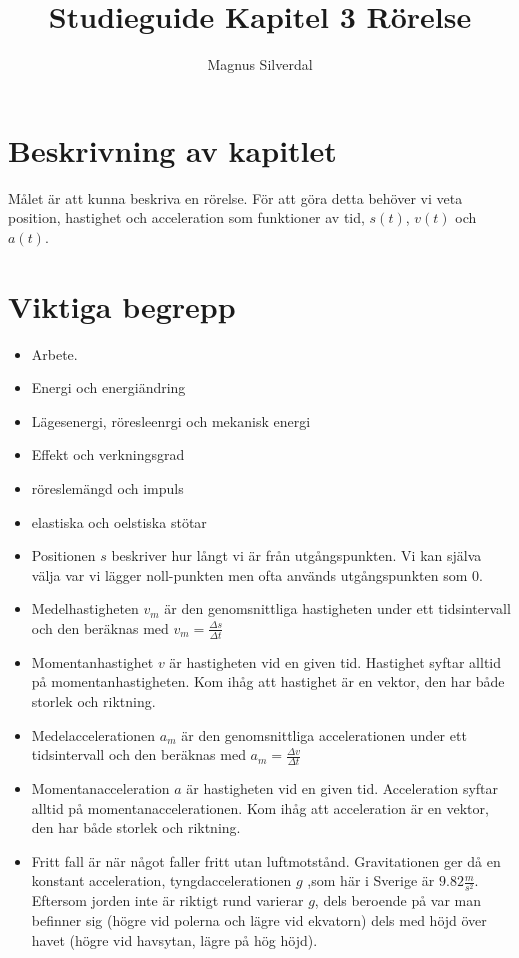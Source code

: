 \documentclass[11pt]{article}
\title{Studieguide Kapitel 3 Rörelse}
\author{Magnus Silverdal}
\begin{document}
\maketitle
\section{Beskrivning av kapitlet}
Målet är att kunna beskriva en rörelse. För att göra detta behöver vi veta position, hastighet och acceleration som
funktioner av tid, $s(t)$, $v(t)$ och $a(t)$.
\section{Viktiga begrepp}
\begin{itemize}
\item Arbete.
\item Energi och energiändring
\item Lägesenergi, röresleenrgi och mekanisk energi
\item Effekt och verkningsgrad
\item röreslemängd och impuls
\item elastiska och oelstiska stötar

\item Positionen $s$ beskriver hur långt vi är från utgångspunkten. Vi kan själva välja var vi lägger noll-punkten
men ofta används utgångspunkten som 0.
\item Medelhastigheten $v_m$ är den genomsnittliga hastigheten under ett tidsintervall och den beräknas med
$v_m=\frac{\Delta s}{\Delta t}$
\item Momentanhastighet $v$ är hastigheten vid en given tid. Hastighet syftar alltid på momentanhastigheten.
Kom ihåg att hastighet är en vektor, den har både storlek och riktning.
\item Medelaccelerationen $a_m$ är den genomsnittliga accelerationen under ett tidsintervall och den beräknas med
$a_m=\frac{\Delta v}{\Delta t}$
\item Momentanacceleration $a$ är hastigheten vid en given tid. Acceleration syftar alltid på momentanaccelerationen.
Kom ihåg att acceleration är en vektor, den har både storlek och riktning.
\item Fritt fall är när något faller fritt utan luftmotstånd. Gravitationen ger då en konstant acceleration,
tyngdaccelerationen $g$ ,som här i Sverige är $9.82 \frac{m}{s^2}$. Eftersom jorden inte är riktigt rund varierar $g$,
dels beroende på var man befinner sig (högre vid polerna och lägre vid ekvatorn) dels med höjd över havet (högre vid
havsytan, lägre på hög höjd).
\end{itemize}
\end{document}
